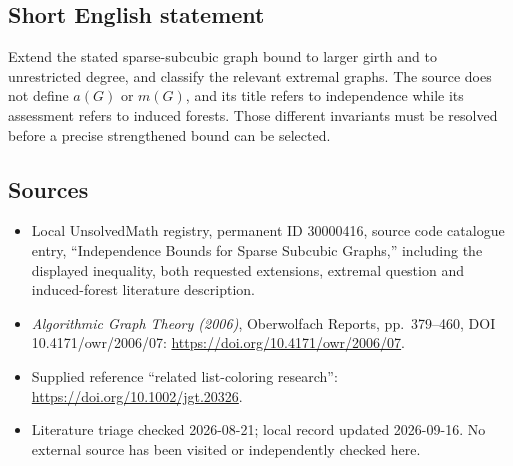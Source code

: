 \documentclass[11pt]{article}
\begin{document}
\subsection{Short English statement}
Extend the stated sparse-subcubic graph bound to larger girth and to unrestricted degree, and classify the relevant extremal graphs. The source does not define \(a(G)\) or \(m(G)\), and its title refers to independence while its assessment refers to induced forests. Those different invariants must be resolved before a precise strengthened bound can be selected.
\subsection{Sources}
\begin{itemize}
\item Local UnsolvedMath registry, permanent ID 30000416, source code catalogue entry, ``Independence Bounds for Sparse Subcubic Graphs,'' including the displayed inequality, both requested extensions, extremal question and induced-forest literature description.
\item \emph{Algorithmic Graph Theory (2006)}, Oberwolfach Reports, pp.\ 379--460, DOI 10.4171/owr/2006/07: \url{https://doi.org/10.4171/owr/2006/07}.
\item Supplied reference ``related list-coloring research'': \url{https://doi.org/10.1002/jgt.20326}.
\item Literature triage checked 2026-08-21; local record updated 2026-09-16. No external source has been visited or independently checked here.
\end{itemize}
\end{document}
